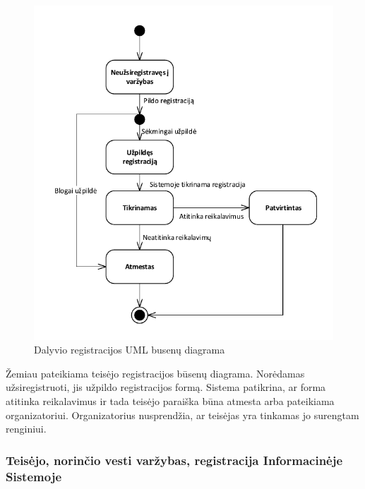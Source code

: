 \documentclass{VUMIFPSkursinis}
\begin{document}
		\begin{figure}[H]
			\centering
			\includegraphics[width=\textwidth]{img/BusenuDiagrama1}
			\caption{Dalyvio registracijos UML busenų diagrama}
			\label{fig:DalyvioRegistracijosUMLBusenuDiagrama}
		\end{figure}
		
		Žemiau pateikiama teisėjo registracijos būsenų diagrama. 
		Norėdamas užsiregistruoti, jis užpildo registracijos formą. 
		Sistema patikrina, ar forma atitinka reikalavimus ir tada teisėjo paraiška būna atmesta arba pateikiama organizatoriui. 
		Organizatorius nusprendžia, ar teisėjas yra tinkamas jo surengtam renginiui.
		
		\subsubsection*{Teisėjo, norinčio vesti varžybas, registracija Informacinėje Sistemoje}
		
\end{document}
